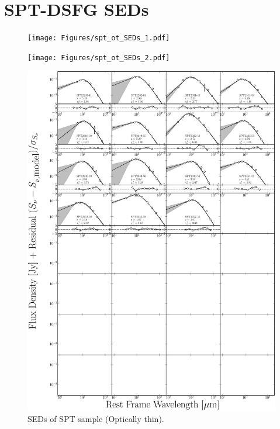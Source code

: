 \chapter{SPT-DSFG SEDs}

\begin{figure}
	\centering
	\texttt{[image: Figures/spt\_ot\_SEDs\_1.pdf]}
\end{figure}
\begin{figure}
	\centering
	\texttt{[image: Figures/spt\_ot\_SEDs\_2.pdf]}
\end{figure}
\begin{figure}
	\centering
	\includegraphics[width=\columnwidth]{Figures/spt_ot_SEDs_3.pdf}
	\caption[SEDs of SPT sample (Optically thin)]{SEDs of SPT sample (Optically thin).}
\end{figure}


